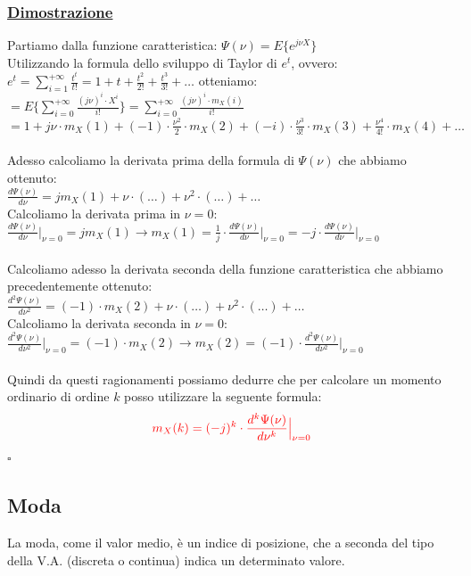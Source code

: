 \documentclass{article}
\begin{document}
\subsubsection{\underline{Dimostrazione}}
Partiamo dalla funzione caratteristica: $\Psi(\nu) = E \big\{ e^{j \nu X} \big\} $ \\
Utilizzando la formula dello sviluppo di Taylor di $e^t$, ovvero: $e^t = \sum_{i=1}^{+\infty} \frac{t^t}{t!} = 1 + t + \frac{t^2}{2!} + \frac{t^3}{3!} + \dots$ otteniamo: \\
$= E \Bigg\{ \sum_{i=0}^{+\infty} \frac{(j\nu)^i \cdot X^i}{i!} \Bigg\} = \sum_{i=0}^{+\infty} \frac{(j\nu)^i \cdot m_X(i)}{i!}$ \\
$= 1 + j\nu \cdot m_X(1) + (-1)\cdot \frac{\nu^2}{2} \cdot m_X(2) + (-i)\cdot \frac{\nu^3}{3!} \cdot m_X(3) + \frac{\nu^4}{4!} \cdot m_X(4) + \dots$ \\ \\
Adesso calcoliamo la derivata prima della formula di $\Psi(\nu)$ che abbiamo ottenuto: \\
$\frac{d\Psi(\nu)}{d\nu} = jm_X(1) + \nu \cdot (\dots)+\nu^2 \cdot (\dots) + \dots$ \\
Calcoliamo la derivata prima in $\nu=0$: \\
$\frac{d\Psi(\nu)}{d\nu} \Big|_{\nu=0} = jm_X(1) \rightarrow m_X(1) = \frac 1j \cdot \frac{d\Psi(\nu)}{d\nu} \Big|_{\nu=0} = -j \cdot \frac{d\Psi(\nu)}{d\nu} \Big|_{\nu=0}$ \\ \\
Calcoliamo adesso la derivata seconda della funzione caratteristica che abbiamo precedentemente ottenuto: \\
$\frac{d^2\Psi(\nu)}{d\nu^2} = (-1) \cdot m_X(2) + \nu \cdot (\dots)+\nu^2 \cdot (\dots) + \dots$ \\
Calcoliamo la derivata seconda in $\nu=0$: \\
$\frac{d^2\Psi(\nu)}{d\nu^2} \Big|_{\nu=0} = (-1) \cdot m_X(2) \rightarrow m_X(2) = (-1) \cdot \frac{d^2\Psi(\nu)}{d\nu^2} \Big|_{\nu=0} $ \\ \\
Quindi da questi ragionamenti possiamo dedurre che per calcolare un momento ordinario di ordine $k$ posso utilizzare la seguente formula:
\[\color{red} m_X(k) = (-j)^k \cdot \frac{d^k\Psi(\nu)}{d\nu^k} \Big|_{\nu=0}\]
\hspace*{0pt}\hfill $\square$

\subsection{Moda}
La moda, come il valor medio, è un indice di posizione, che a seconda del tipo della V.A. (discreta o continua) indica un determinato valore.
\end{document}
